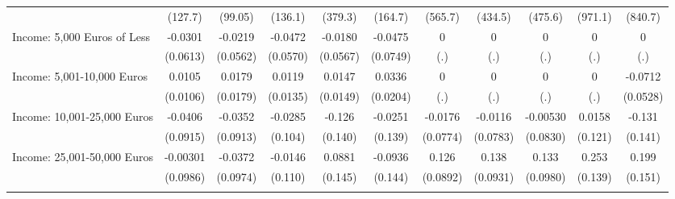 {\begin{tabular}{l*{10}{c}}
            &     (127.7)         &     (99.05)         &     (136.1)         &     (379.3)         &     (164.7)         &     (565.7)         &     (434.5)         &     (475.6)         &     (971.1)         &     (840.7)         \\
\addlinespace
Income: 5,000 Euros of Less&     -0.0301         &     -0.0219         &     -0.0472         &     -0.0180         &     -0.0475         &           0         &           0         &           0         &           0         &           0         \\
            &    (0.0613)         &    (0.0562)         &    (0.0570)         &    (0.0567)         &    (0.0749)         &         (.)         &         (.)         &         (.)         &         (.)         &         (.)         \\
\addlinespace
Income: 5,001-10,000 Euros&      0.0105         &      0.0179         &      0.0119         &      0.0147         &      0.0336         &           0         &           0         &           0         &           0         &     -0.0712         \\
            &    (0.0106)         &    (0.0179)         &    (0.0135)         &    (0.0149)         &    (0.0204)         &         (.)         &         (.)         &         (.)         &         (.)         &    (0.0528)         \\
\addlinespace
Income: 10,001-25,000 Euros&     -0.0406         &     -0.0352         &     -0.0285         &      -0.126         &     -0.0251         &     -0.0176         &     -0.0116         &    -0.00530         &      0.0158         &      -0.131         \\
            &    (0.0915)         &    (0.0913)         &     (0.104)         &     (0.140)         &     (0.139)         &    (0.0774)         &    (0.0783)         &    (0.0830)         &     (0.121)         &     (0.141)         \\
\addlinespace
Income: 25,001-50,000 Euros&    -0.00301         &     -0.0372         &     -0.0146         &      0.0881         &     -0.0936         &       0.126         &       0.138         &       0.133         &       0.253         &       0.199         \\
            &    (0.0986)         &    (0.0974)         &     (0.110)         &     (0.145)         &     (0.144)         &    (0.0892)         &    (0.0931)         &    (0.0980)         &     (0.139)         &     (0.151)         \\
\addlinespace

\end{tabular}}
